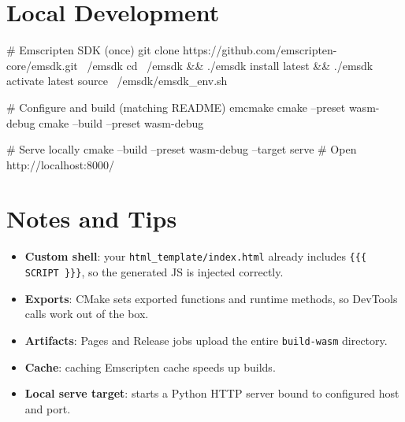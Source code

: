 \documentclass[11pt]{article}
\begin{document}

\section{Local Development}

\begin{bashcode}
# Emscripten SDK (once)
git clone https://github.com/emscripten-core/emsdk.git ~/emsdk
cd ~/emsdk && ./emsdk install latest && ./emsdk activate latest
source ~/emsdk/emsdk_env.sh

# Configure and build (matching README)
emcmake cmake --preset wasm-debug
cmake --build --preset wasm-debug

# Serve locally
cmake --build --preset wasm-debug --target serve
# Open http://localhost:8000/
\end{bashcode}

\section{Notes and Tips}

\begin{itemize}
  \item \textbf{Custom shell}: your \texttt{html\_template/index.html} already includes \texttt{\{\{\{ SCRIPT \}\}\}}, so the generated JS is injected correctly.
  \item \textbf{Exports}: CMake sets exported functions and runtime methods, so DevTools calls work out of the box.
  \item \textbf{Artifacts}: Pages and Release jobs upload the entire \texttt{build-wasm} directory.
  \item \textbf{Cache}: caching Emscripten cache speeds up builds.
  \item \textbf{Local serve target}: starts a Python HTTP server bound to configured host and port.
\end{itemize}
\end{document}
